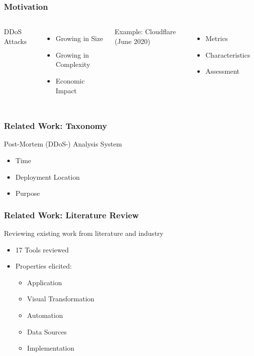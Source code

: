 \documentclass[fleqn]{beamer}
\begin{document}
    \begin{frame}
      \frametitle{Motivation}
      \begin{columns}[T]
        DDoS Attacks
        \begin{itemize}
          \item Growing in Size
          \item Growing in Complexity
          \item Economic Impact
        \end{itemize}
        
          Example: Cloudflare (June 2020)
          \begin{itemize}
              \item Metrics
              \item Characteristics
              \item Assessment
          \end{itemize}
        
      \end{columns}
    \end{frame}
    
    \begin{frame}
      \frametitle{Related Work: Taxonomy}
          Post-Mortem (DDoS-) Analysis System
      \begin{itemize}
          \item Time\\
          \item Deployment Location\\
          \item Purpose
      \end{itemize}
    \end{frame}
    
    \begin{frame}
      \frametitle{Related Work: Literature Review}
      Reviewing existing work from literature and industry
      \begin{itemize}
          \item 17 Tools reviewed
          \item Properties elicited:
          \begin{itemize}
             \item Application
             \item Visual Transformation 
             \item Automation 
             \item Data Sources
             \item Implementation
          \end{itemize}
      \end{itemize}
    \end{frame}
    
\end{document}
